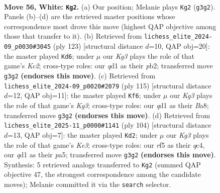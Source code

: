\documentclass[11pt]{article}
\begin{document}
\clearpage

\begin{figure}[p]\centering
\begin{subfigure}{0.46\textwidth}\centering
\resizebox{\linewidth}{!}{%
\newchessgame
\chessboard[
  setfen={8/6pk/1P6/5r2/3ppP2/6K1/8/3q4 w - - 1 56},
  showmover=false,
  pgfstyle=straightmove, color=movearrow, markmove={g3-g2}
]}
\caption{}
\end{subfigure}\hfill
\begin{subfigure}{0.46\textwidth}\centering
\resizebox{\linewidth}{!}{%
\newchessgame
\chessboard[
  setfen={8/ppk5/4pR2/8/3P4/P3K3/1P6/8 b - - 2 62},
  showmover=false,
  pgfstyle=straightmove, color=movearrow, markmove={c7-d6}
]}
\caption{}
\end{subfigure}
\\[4pt]
\begin{subfigure}{0.46\textwidth}\centering
\resizebox{\linewidth}{!}{%
\newchessgame
\chessboard[
  setfen={b7/4R3/6k1/4pp2/2P4P/2K5/5P2/8 b - - 2 58},
  showmover=false,
  pgfstyle=straightmove, color=movearrow, markmove={g6-f6}
]}
\caption{}
\end{subfigure}\hfill
\begin{subfigure}{0.46\textwidth}\centering
\resizebox{\linewidth}{!}{%
\newchessgame
\chessboard[
  setfen={k7/1p6/7p/p7/2q3P1/4K2P/8/8 w - - 0 53},
  showmover=false,
  pgfstyle=straightmove, color=movearrow, markmove={e3-d2}
]}
\caption{}
\end{subfigure}
\caption{\textbf{Move 56, White: \texttt{Kg2}.} (a) Our position; Melanie plays \texttt{Kg2} (\texttt{g3g2}). Panels (b)--(d) are the retrieved master positions whose correspondence most drove this move (highest QAP objective among those that transfer to it). (b) Retrieved from \texttt{lichess\_elite\_2024-09\_p0030\#3045} (ply 123) [structural distance $d$=10, QAP obj=20]: the master played \texttt{Kd6}; under $\mu$ our \emph{Kg3} plays the role of that game's \emph{Kc2}; cross-type roles: our \emph{q}d1 as their \emph{p}b2; transferred move \texttt{g3g2} \textbf{(endorses this move)}. (c) Retrieved from \texttt{lichess\_elite\_2024-09\_p0020\#2079} (ply 115) [structural distance $d$=12, QAP obj=11]: the master played \texttt{Kf6}; under $\mu$ our \emph{Kg3} plays the role of that game's \emph{Kg3}; cross-type roles: our \emph{q}d1 as their \emph{B}a8; transferred move \texttt{g3g2} \textbf{(endorses this move)}. (d) Retrieved from \texttt{lichess\_elite\_2025-11\_p0000\#1141} (ply 104) [structural distance $d$=13, QAP obj=7]: the master played \texttt{Kd2}; under $\mu$ our \emph{Kg3} plays the role of that game's \emph{Ke3}; cross-type roles: our \emph{r}f5 as their \emph{q}c4, our \emph{q}d1 as their \emph{p}a5; transferred move \texttt{g3g2} \textbf{(endorses this move)}. Synthesis: 5 retrieved analogs transferred to \texttt{Kg2} (summed QAP objective 47, the strongest correspondence among the candidate moves); Melanie committed it via the \texttt{search} selector.}
\label{fig:thought-m110}
\end{figure}
\end{document}
